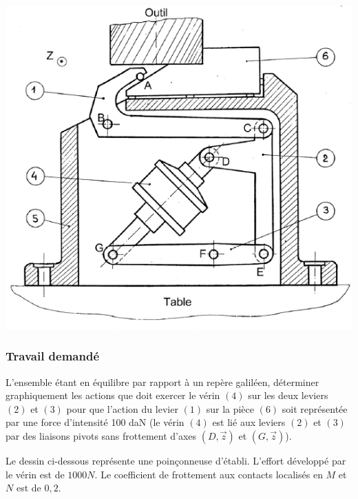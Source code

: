 \begin{center}
\includegraphics[scale=0.6]{png/montage.png}
\end{center}

\subsubsection{Travail demandé}
L’ensemble étant en équilibre par rapport à un repère galiléen, déterminer graphiquement les actions que doit exercer le vérin $(4)$ sur les deux leviers $(2)$ et $(3)$ pour que l’action du levier $(1)$ sur la pièce $(6)$ soit représentée par une force d’intensité 100 daN (le vérin $(4)$ est lié aux leviers $(2)$ et $(3)$ par des liaisons pivots sans frottement d’axes $(D,\overrightarrow{z})$ et $(G,\overrightarrow{z})$).

\newpage



Le dessin ci-dessous représente une poinçonneuse d’établi. L’effort développé par le vérin est de $1000N$. Le coefficient de frottement aux contacts localisés en $M$ et $N$ est de $0,2$.


